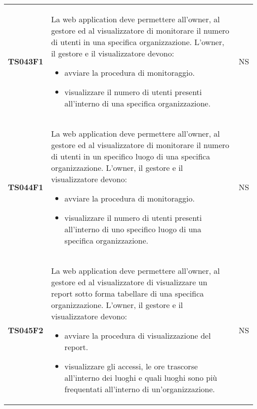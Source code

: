 \documentclass[../piano-di-qualifica.tex]{subfiles}
\begin{document}
\begin{longtable}[H]{>{\centering\bfseries}m{3cm} >{}m{10cm} >{\centering\arraybackslash}m{3cm}}
  TS043F1            & La web application deve permettere all'owner, al gestore ed al visualizzatore di monitorare il numero di utenti in una specifica organizzazione. \newline
  L'owner, il gestore e il visualizzatore devono:
  \begin{itemize}
    \item avviare la procedura di monitoraggio.
    \item visualizzare il numero di utenti presenti all'interno di una specifica organizzazione.
  \end{itemize}
                     & NS                                                                                                                                                                                                                                                               \\
  TS044F1            & La web application deve permettere all'owner, al gestore ed al visualizzatore di monitorare il numero di utenti in un specifico luogo di una specifica organizzazione. \newline
  L'owner, il gestore e il visualizzatore devono:
  \begin{itemize}
    \item avviare la procedura di monitoraggio.
    \item visualizzare il numero di utenti presenti all'interno di uno specifico luogo di una specifica organizzazione.
  \end{itemize}
                     & NS                                                                                                                                                                                                                                                               \\
  TS045F2            & La web application deve permettere all'owner, al gestore ed al visualizzatore di visualizzare un report sotto forma tabellare di una specifica organizzazione. \newline
  L'owner, il gestore e il visualizzatore devono:
  \begin{itemize}
    \item avviare la procedura di visualizzazione del report.
    \item visualizzare gli accessi, le ore trascorse all'interno dei luoghi e quali luoghi sono più frequentati all'interno di un'organizzazione.
  \end{itemize}
                     & NS                                                                                                                                                                                                                                                               \\

\end{longtable}
\end{document}
